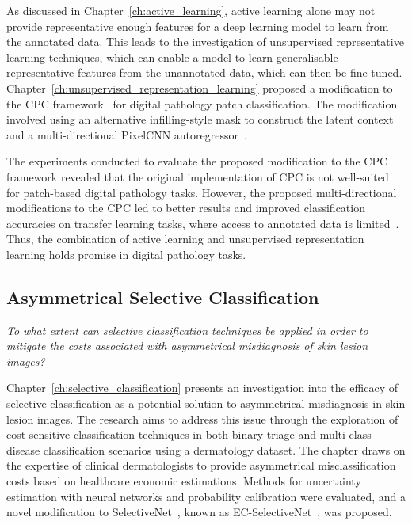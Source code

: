 As discussed in Chapter~\ref{ch:active_learning}, active learning alone may not provide representative enough features for a deep learning model to learn from the annotated data. This leads to the investigation of unsupervised representative learning techniques, which can enable a model to learn generalisable representative features from the unannotated data, which can then be fine-tuned. Chapter~\ref{ch:unsupervised_representation_learning} proposed a modification to the CPC framework~\citep{oord2018representation} for digital pathology patch classification. The modification involved using an alternative infilling-style mask to construct the latent context and a multi-directional PixelCNN autoregressor~\citep{oord2016pixel}.

The experiments conducted to evaluate the proposed modification to the CPC framework revealed that the original implementation of CPC is not well-suited for patch-based digital pathology tasks. However, the proposed multi-directional modifications to the CPC led to better results and improved classification accuracies on transfer learning tasks, where access to annotated data is limited~\citep{carse2021unsupervised}. Thus, the combination of active learning and unsupervised representation learning holds promise in digital pathology tasks.

\newpage
\subsection{Asymmetrical Selective Classification}
\textit{To what extent can selective classification techniques be applied in order to mitigate the costs associated with asymmetrical misdiagnosis of skin lesion images?}

Chapter~\ref{ch:selective_classification} presents an investigation into the efficacy of selective classification as a potential solution to asymmetrical misdiagnosis in skin lesion images. The research aims to address this issue through the exploration of cost-sensitive classification techniques in both binary triage and multi-class disease classification scenarios using a dermatology dataset. The chapter draws on the expertise of clinical dermatologists to provide asymmetrical misclassification costs based on healthcare economic estimations. Methods for uncertainty estimation with neural networks and probability calibration were evaluated, and a novel modification to SelectiveNet~\citep{geifman2019selectivenet}, known as EC-SelectiveNet~\citep{carse2021robust}, was proposed. 


